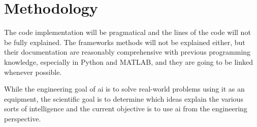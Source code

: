 \chapter{Methodology}\label{sec:methodology}

The code implementation will be pragmatical and the lines of the code will not be fully explained. The frameworks methods will not be explained either, but their documentation are reasonably comprehensive with previous programming knowledge, especially in Python and MATLAB, and they are going to be linked whenever possible.

While the engineering goal of \gls*{ai} is to solve real-world problems using it as an equipment, the scientific goal is to determine which ideas explain the various sorts of intelligence \cite{winston1992} and the current objective is to use \gls*{ai} from the engineering perspective.